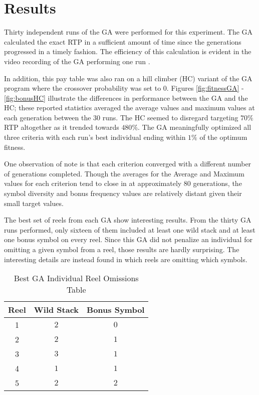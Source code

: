 \documentclass[conference]{IEEEtran}
\begin{document}
\section{Results}
\label{result}
Thirty independent runs of the GA were performed for this experiment.
The GA calculated the exact RTP in a sufficient amount of time since the generations progressed in a timely fashion. The efficiency of this calculation is evident in the video recording of the GA performing one run \cite{VideoRecording}.
\par
In addition, this pay table was also ran on a hill climber (HC) variant of the GA program where the crossover probability was set to 0.
Figures \ref{fig:fitnessGA} - \ref{fig:bonusHC} illustrate the differences in performance between the GA and the HC; these reported statistics averaged the average values and maximum values at each generation between the 30 runs.
The HC seemed to disregard targeting $70\%$ RTP altogether as it trended towards $480\%$.
The GA meaningfully optimized all three criteria with each run's best individual ending within $1\%$ of the optimum fitness.
\par
One observation of note is that each criterion converged with a different number of generations completed.
Though the averages for the Average and Maximum values for each criterion tend to close in at approximately 80 generations, the symbol diversity and bonus frequency values are relatively distant given their small target values.
\par
The best set of reels from each GA show interesting results.
From the thirty GA runs performed, only sixteen of them included at least one wild stack and at least one bonus symbol on every reel.
Since this GA did not penalize an individual for omitting a given symbol from a reel, those results are hardly surprising.
The interesting details are instead found in which reels are omitting which symbols.
\begin{table}[htbp]
\caption{Best GA Individual Reel Omissions Table}
\begin{center}
\begin{tabular}{|c|c|c|}
\hline
\textbf{Reel}&\textbf{Wild Stack}&\textbf{Bonus Symbol} \\
\hline
1 & $2$ & $0$ \\
\hline
2 & $2$ & $1$  \\
\hline
3 & $3$ & $1$ \\
\hline
4 & $1$ & $1$  \\
\hline
5 & $2$ & $2$  \\
\hline
\end{tabular}
\label{omissions}
\end{center}
\end{table}
\end{document}

